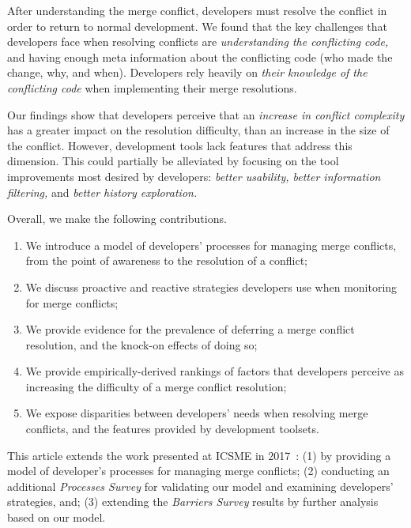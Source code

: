 After understanding the merge conflict, developers must resolve the conflict in order to return to normal development.
We found that the key challenges that developers face when resolving conflicts are \textit{understanding the conflicting code,} and having enough meta information about the conflicting code (who made the change, why, and when).
Developers rely heavily on \textit{their knowledge of the conflicting code} when implementing their merge resolutions.

Our findings show that developers perceive that an \textit{increase in conflict complexity} has a greater impact on the resolution difficulty, than an increase in the size of the conflict.
However, development tools lack features that address this dimension.
This could partially be alleviated by focusing on the tool improvements most desired by developers: \textit{better usability, better information filtering,} and \textit{better history exploration.}


Overall, we make the following contributions.
\begin{enumerate}
\item We introduce a model of developers' processes for managing merge conflicts, from the point of awareness to the resolution of a conflict;
\item We discuss proactive and reactive strategies developers use when monitoring for merge conflicts;
\item We provide evidence for the prevalence of deferring a merge conflict resolution, and the knock-on effects of doing so;
\item We provide empirically-derived rankings of factors that developers perceive as increasing the difficulty of a merge conflict resolution;
\item We expose disparities between developers' needs when resolving merge conflicts, and the features provided by development toolsets.
\end{enumerate}

This article extends the work presented at ICSME in 2017~\cite{mckee2017software}: 
(1) by providing a model of developer's processes for managing merge conflicts; 
(2) conducting an additional \emph{Processes Survey} for validating our model and examining developers' strategies, and; 
(3) extending the \emph{Barriers Survey} results by further analysis based on our model. 